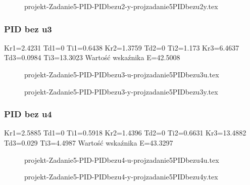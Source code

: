 \ifdefined\CompileFigures
\begin{figure}[H] 
    \centering
    
    \caption{projekt-Zadanie5-PID-PIDbezu2-y-projzadanie5PIDbezu2y.tex}
    \label{projekt:zad5:figure:projzadanie5PIDbezu2y}
\end{figure}
\fi

\subsubsection{PID bez u3}
Kr1=2.4231 Td1=0 Ti1=0.6438 
Kr2=1.3759 Td2=0 Ti2=1.173 
Kr3=6.4637 Td3=0.0984 Ti3=13.3023 
Wartość wskaźnika E=42.5008

\ifdefined\CompileFigures
\begin{figure}[H] 
    \centering
    
    \caption{projekt-Zadanie5-PID-PIDbezu3-u-projzadanie5PIDbezu3u.tex}
    \label{projekt:zad5:figure:projzadanie5PIDbezu3u}
\end{figure}
\fi

\ifdefined\CompileFigures
\begin{figure}[H] 
    \centering
    
    \caption{projekt-Zadanie5-PID-PIDbezu3-y-projzadanie5PIDbezu3y.tex}
    \label{projekt:zad5:figure:projzadanie5PIDbezu3y}
\end{figure}
\fi

\subsubsection{PID bez u4}
Kr1=2.5885 Td1=0 Ti1=0.5918 
Kr2=1.4396 Td2=0 Ti2=0.6631 
Kr3=13.4882 Td3=0.029 Ti3=4.4987 
Wartość wskaźnika E=43.3297

\ifdefined\CompileFigures
\begin{figure}[H] 
    \centering
    
    \caption{projekt-Zadanie5-PID-PIDbezu4-u-projzadanie5PIDbezu4u.tex}
    \label{projekt:zad5:figure:projzadanie5PIDbezu4u}
\end{figure}
\fi

\ifdefined\CompileFigures
\begin{figure}[H] 
    \centering
    
    \caption{projekt-Zadanie5-PID-PIDbezu4-y-projzadanie5PIDbezu4y.tex}
    \label{projekt:zad5:figure:projzadanie5PIDbezu4y}
\end{figure}
\fi


